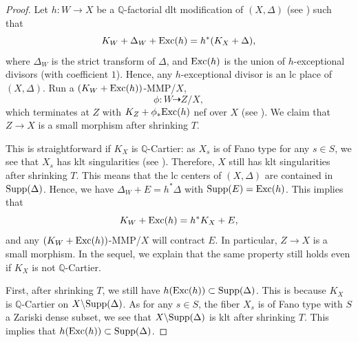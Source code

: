 \documentclass[11pt,oneside,reqno]{amsart}
\numberwithin{equation}{section}
\theoremstyle{definition}
\newcommand{\Exc}{{\rm {Exc}}}
\newcommand{\Supp}{{\rm {Supp}}}
\newcommand{\bQ}{\mathbb{Q}}
\begin{document}
\begin{proof}
Let $h: W \to X$ be a $\bQ$-factorial dlt modification of $(X, \Delta)$ (see \cite{BCHM10}) such that
\[
K_W+\Delta_W+\Exc(h)=h^*(K_X+\Delta),
\] where $\Delta_W$ is the strict transform of $\Delta$, and $\Exc(h)$ is the union of $h$-exceptional divisors (with coefficient $1$). Hence, any $h$-exceptional divisor is an lc place of $(X, \Delta)$. Run a $(K_W+\Exc(h))$-MMP/$X$, 
\[
\phi: W \dasharrow Z/X,
\] which terminates at $Z$ with $K_Z+\phi_*\Exc(h)$ nef over $X$ (see \cite{HX13}). We claim that $Z \to X$ is a small morphism after shrinking $T$. 

This is straightforward if $K_X$ is $\bQ$-Cartier: as $X_s$ is of Fano type for any $s\in S$, we see that $X_s$ has klt singularities (see \cite[Theorem 9.5.19]{Laz04b}). Therefore, $X$ still has klt singularities after shrinking $T$. This means that the lc centers of $(X, \Delta)$ are contained in $\Supp(\Delta)$. Hence, we have $\Delta_W+E=h^*\Delta$ with $\Supp(E) = \Exc(h)$. This implies that
\[
K_W+\Exc(h)=h^*K_X+E,
\] and any $(K_W+\Exc(h))$-MMP/$X$ will contract $E$. In particular, $Z \to X$ is a small morphism. In the sequel, we explain that the same property still holds even if $K_X$ is not $\bQ$-Cartier.

First, after shrinking $T$, we still have $h(\Exc(h)) \subset \Supp(\Delta)$. This is because $K_X$ is $\bQ$-Cartier on $X \backslash \Supp(\Delta)$.  As for any $s\in S$, the fiber $X_s$ is of Fano type with $S$ a Zariski dense subset, we see that $X \backslash \Supp(\Delta)$ is klt after shrinking $T$. This implies that $h(\Exc(h)) \subset \Supp(\Delta)$. 


\end{proof}
\end{document}
